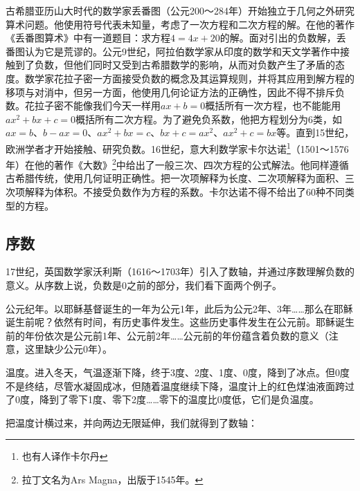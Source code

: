\documentclass[b5paper]{ctexart}
\begin{document}
 
古希腊亚历山大时代的数学家丢番图（公元200～284年）开始独立于几何之外研究算术问题。他使用符号代表未知量，考虑了一次方程和二次方程的解。在他的著作《丢番图算术》中有一道题目：求方程$4 = 4x + 20$的解。面对引出的负数解，丢番图认为它是荒谬的。公元9世纪，阿拉伯数学家从印度的数学和天文学著作中接触到了负数，但他们同时又受到古希腊数学的影响，从而对负数产生了矛盾的态度。数学家花拉子密一方面接受负数的概念及其运算规则，并将其应用到解方程的移项与对消中，但另一方面，他使用几何论证方法的正确性，因此不得不排斥负数。花拉子密不能像我们今天一样用$ax + b = 0$概括所有一次方程，也不能能用$ax^2 + bx + c = 0$概括所有二次方程。为了避免负系数，他把方程划分为6类，如$ax = b$、$b - ax = 0$、$ax^2 + bx = c$、$bx + c = ax^2$、$ax^2 + c = bx$等。直到15世纪，欧洲学者才开始接触、研究负数。16世纪，意大利数学家卡尔达诺\footnote{也有人译作卡尔丹}（1501～1576年）在他的著作《大数》\footnote{拉丁文名为Ars Magna，出版于1545年。}中给出了一般三次、四次方程的公式解法。他同样遵循古希腊传统，使用几何证明正确性。把一次项解释为长度、二次项解释为面积、三次项解释为体积。不接受负数作为方程的系数。卡尔达诺不得不给出了60种不同类型的方程。

\subsection{序数}
  
17世纪，英国数学家沃利斯（1616～1703年）引入了数轴，并通过序数理解负数的意义。从序数上说，负数是0之前的部分，我们看下面两个例子。

\begin{example}
公元纪年。以耶稣基督诞生的一年为公元1年，此后为公元2年、3年……那么在耶稣诞生前呢？依然有时间，有历史事件发生。这些历史事件发生在公元前。耶稣诞生前的年份依次是公元前1年、公元前2年……公元前的年份蕴含着负数的意义（注意，这里缺少公元0年）。
\end{example}

\begin{example}
温度。进入冬天，气温逐渐下降，终于3度、2度、1度、0度，降到了冰点。但0度不是终结，尽管水凝固成冰，但随着温度继续下降，温度计上的红色煤油液面跨过了0度，降到了零下1度、零下2度……零下的温度比0度低，它们是负温度。
\end{example}

把温度计横过来，并向两边无限延伸，我们就得到了数轴：

\begin{center}
\end{center}
\end{document}
